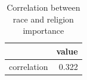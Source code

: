 \begin{table}[htbp]
\centering
\caption{Correlation between race and religion importance}
\label{tab:q6_race_religion}
\begin{tabular}{lr}
\toprule
 & value \\
\midrule
correlation & 0.322 \\
\bottomrule
\end{tabular}
\end{table}

